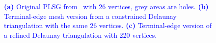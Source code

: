 \documentclass[pdflatex,sn-mathphys]{sn-jnl}%
\theoremstyle{thmstyleone}%
\theoremstyle{thmstyletwo}%
\theoremstyle{thmstylethree}%
\begin{document}
\begin{figure}[!h]
\centering     %
{} \hspace{0.5cm}
\hspace{0.5cm}
\caption{\textcolor{blue}{\textbf{(a)} Original PLSG from~\cite{Shewchuktriangle} with 26 vertices, grey areas are holes. \textbf{(b)} Terminal-edge mesh version from a constrained Delaunay triangulation with the same 26 vertices. \textbf{(c)} Terminal-edge version of a refined Delaunay triangulation with 220 vertices.}}
\label{figs:facePSLG} 
\end{figure}
\end{document}
